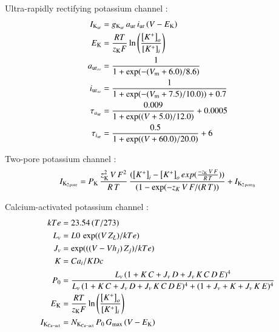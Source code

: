 Ultra-rapidly rectifying potassium channel \citep{Maleckaretal2009}:
\begin{equation}
  \begin{split}
    I_{\rm K_{\rm ur}} & = g_{\rm K_{\rm ur}}\, a_{\rm ur}\, i_{\rm
      ur}\, (V - E_{\rm K})\\
    E_{\rm K} & =  \frac{R T}{z_{\rm K} F}
    \ln\left(\frac{\left[K^{+}\right]_{o}}
      {\left[K^{+}\right]_{i}}\right)\\
    a_{{\rm ur}_{\infty}} & = \frac{1}{1 + \exp(-(V_{\rm m} +
      6.0)/8.6)}\\
    i_{{\rm ur}_{\infty}} & = \frac{1}{1 + \exp(-(V_{\rm m} +
      7.5)/10.0)) + 0.7}\\
    \tau_{a_{\rm ur}} & = \frac{0.009}{1 + \exp((V + 5.0)/12.0)} +
    0.0005\\
    \tau_{i_{\rm ur}} & = \frac{0.5}{1 + \exp((V +60.0)/20.0)} +
    6\\
  \end{split}
\end{equation}

Two-pore potassium channel \citep{UNKNOWN}:
\begin{equation}
 I_{\rm K_{2\, pore}} = P_{\rm K}\, \frac{z_{\rm K}^2\, V\, F^{2}}{R\,
   T}\, \frac{({\left[K^{+}\right]_{i}} - {\left[K^{+}\right]_{o}}\,
 exp(\frac{-z_{\rm K}\, V\, F}{R\, T}))}{(1 - \exp(-z_K\, V\, F/(R\,
 T))} + I_{{\rm K_{2\, pore}}_0}
\end{equation}

Calcium-activated potassium channel \citep{HorriganAldrich2002}:
\begin{equation}
  \begin{split}
    kTe & = 23.54\, (T/273)\\
    L_v & = L0\, \exp((V\, Z_L)/kTe)\\
    J_v & = \exp(((V - Vh_j)\, Z_j)/kTe)\\
    K & = Ca_i/KDc\\
    P_0 & = \frac{L_v\, (1+K\, C+J_v\, D+J_v\, K\, C\, D\, E)^4}
    {L_v\, (1+K\, C+J_v\, D+J_v\, K\, C\, D\, E)^4 +
      (1+J_v+K+J_v\, K\, E)^4}\\
    E_{\rm K} & =  \frac{R T}{z_{\rm K} F}
    \ln\left(\frac{\left[K^{+}\right]_{o}}
      {\left[K^{+}\right]_{i}}\right)\\
    I_{\rm K_{Ca-act}} & = N_{\rm K_{Ca-act}}\, P_0\, G_{\rm max}\, (V -
    E_{\rm K})
  \end{split}
\end{equation}

